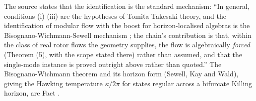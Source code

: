 The source states that the identification is the standard mechanism: ``In general, conditions (i)-(iii) are the hypotheses of Tomita-Takesaki theory, and the identification of modular flow with the boost for horizon-localised algebras is the Bisognano-Wichmann-Sewell mechanism \cite{BW1976, Sewell1982}; the chain's contribution is that, within the class of real rotor flows the geometry supplies, the flow is algebraically \emph{forced} (Theorem (5), with the scope stated there) rather than assumed, and that the single-mode instance is proved outright above rather than quoted.'' The Bisognano-Wichmann theorem and its horizon form (Sewell, Kay and Wald), giving the Hawking temperature $\kappa/2\pi$ for states regular across a bifurcate Killing horizon, are Fact .
